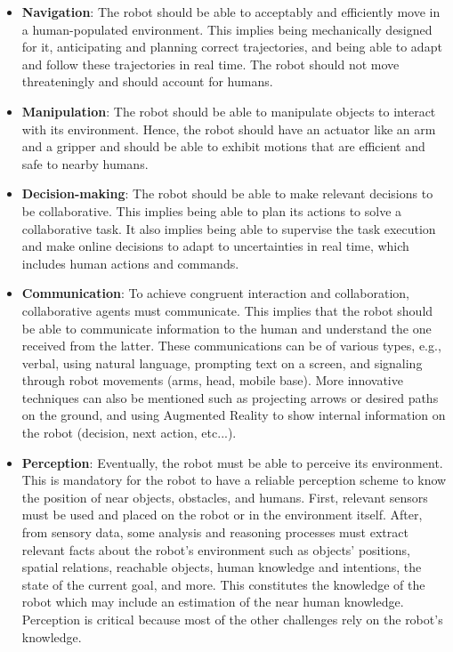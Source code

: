 \begin{itemize}
    \item \textbf{Navigation}: The robot should be able to acceptably and efficiently move in a human-populated environment. This implies being mechanically designed for it, anticipating and planning correct trajectories, and being able to adapt and follow these trajectories in real time. The robot should not move threateningly and should account for humans.

    \item \textbf{Manipulation}: The robot should be able to manipulate objects to interact with its environment. Hence, the robot should have an actuator like an arm and a gripper and should be able to exhibit motions that are efficient and safe to nearby humans.

    \item \textbf{Decision-making}: The robot should be able to make relevant decisions to be collaborative. This implies being able to plan its actions to solve a collaborative task. It also implies being able to supervise the task execution and make online decisions to adapt to uncertainties in real time, which includes human actions and commands. 

    \item \textbf{Communication}: To achieve congruent interaction and collaboration, collaborative agents must communicate. This implies that the robot should be able to communicate information to the human and understand the one received from the latter. These communications can be of various types, e.g., verbal, using natural language, prompting text on a screen, and signaling through robot movements (arms, head, mobile base). More innovative techniques can also be mentioned such as projecting arrows or desired paths on the ground, and using Augmented Reality to show internal information on the robot (decision, next action, etc...).

    \item \textbf{Perception}: Eventually, the robot must be able to perceive its environment. This is mandatory for the robot to have a reliable perception scheme to know the position of near objects, obstacles, and humans. First, relevant sensors must be used and placed on the robot or in the environment itself. After, from sensory data, some analysis and reasoning processes must extract relevant facts about the robot's environment such as objects' positions, spatial relations, reachable objects, human knowledge and intentions, the state of the current goal, and more. This constitutes the knowledge of the robot which may include an estimation of the near human knowledge. Perception is critical because most of the other challenges rely on the robot's knowledge.

\end{itemize}
    

